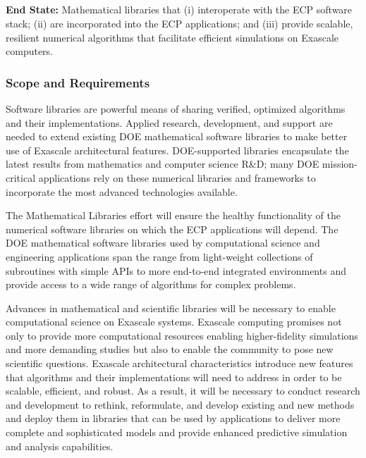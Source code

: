 \subsection{ \mathlibs}\label{subsect:mathlibs}

\textbf{End State:} Mathematical libraries that (i) interoperate with the ECP software stack; (ii) are incorporated into the ECP applications; and (iii) provide scalable, resilient numerical algorithms that facilitate efficient simulations on Exascale computers.

\subsubsection{Scope and Requirements}
Software libraries are powerful means of sharing verified, optimized algorithms and their implementations. Applied research, development, and support are needed to extend existing DOE mathematical software libraries to make better use of Exascale architectural features. DOE-supported libraries encapsulate the latest results from mathematics and computer science R\&D; many DOE mission-critical applications rely on these numerical libraries and frameworks to incorporate the most advanced technologies available. 

The Mathematical Libraries effort will ensure the healthy functionality of the numerical software libraries on which the ECP applications will depend. The DOE mathematical software libraries used by computational science and engineering applications span the range from light-weight collections of subroutines with simple APIs to more end-to-end integrated environments and provide access to a wide range of algorithms for complex problems.

Advances in mathematical and scientific libraries will be necessary to enable computational science on Exascale systems. Exascale computing promises not only to provide more computational resources enabling higher-fidelity simulations and more demanding studies but also to enable the community to pose new scientific questions. Exascale architectural characteristics introduce new features that algorithms and their implementations will need to address in order to be scalable, efficient, and robust. As a result, it will be necessary to conduct research and development to rethink, reformulate, and develop existing and new methods and deploy them in libraries that can be used by applications to deliver more complete and sophisticated models and provide enhanced predictive simulation and analysis capabilities.

